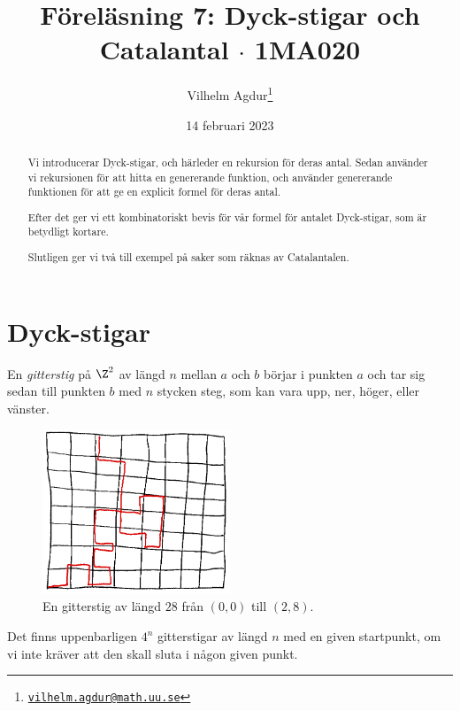 \documentclass{tufte-handout}
\title{Föreläsning 7: Dyck-stigar och Catalantal $\cdot$ 1MA020}
\author[Vilhelm Agdur]{Vilhelm Agdur\thanks{\href{mailto:vilhelm.agdur@math.uu.se}{\nolinkurl{vilhelm.agdur@math.uu.se}}}}
\date{14 februari 2023}
\begin{document}

\maketitle%

\begin{abstract}
\noindent
Vi introducerar Dyck-stigar, och härleder en rekursion för deras antal. Sedan använder vi rekursionen för att hitta en genererande funktion, och använder genererande funktionen för att ge en explicit formel för deras antal.

Efter det ger vi ett kombinatoriskt bevis för vår formel för antalet Dyck-stigar, som är betydligt kortare.

Slutligen ger vi två till exempel på saker som räknas av Catalantalen.
\end{abstract}

\section{Dyck-stigar}

\begin{definition}
    En \emph{gitterstig} på $\Z^2$ av längd $n$ mellan $a$ och $b$ börjar i punkten $a$ och tar sig sedan till punkten $b$ med $n$ stycken steg, som kan vara upp, ner, höger, eller vänster.
    \begin{figure}
        \centering
        \includegraphics[width=0.5\textwidth]{graphics/general_lattice_path.png}
        \caption{En gitterstig av längd $28$ från $(0,0)$ till $(2,8)$.}
    \end{figure} 
\end{definition}

Det finns uppenbarligen $4^n$ gitterstigar av längd $n$ med en given startpunkt, om vi inte kräver att den skall sluta i någon given punkt.
\end{document}

